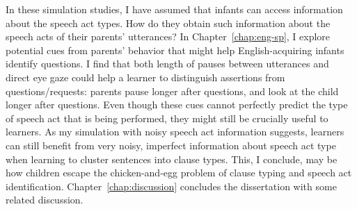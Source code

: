 In these simulation studies, I have assumed that infants can access information about the speech act types. How do they obtain such information about the speech acts of their parents' utterances? In Chapter~\ref{chap:eng-sp}, I explore potential cues from parents' behavior that might help English-acquiring infants identify questions. I find that both length of pauses between utterances and direct eye gaze could help a learner to distinguish assertions from questions/requests: parents pause longer after questions, and look at the child longer after questions. Even though these cues cannot perfectly predict the type of speech act that is being performed, they might still be crucially useful to learners. As my simulation with noisy speech act information suggests, learners can still benefit from very noisy, imperfect information about speech act type when learning to cluster sentences into clause types. This, I conclude, may be how children escape the chicken-and-egg problem of clause typing and speech act identification. Chapter~\ref{chap:discussion} concludes the dissertation with some related discussion.


